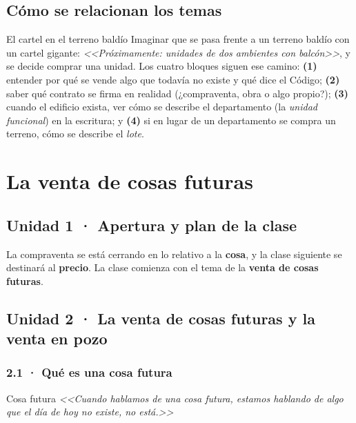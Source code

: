 \documentclass[12pt,oneside]{book}
\begin{document}
\section{Cómo se relacionan los temas}

\begin{example}{El cartel en el terreno baldío}
Imaginar que se pasa frente a un terreno baldío con un cartel gigante: \textit{<<Próximamente: unidades de dos ambientes con balcón>>}, y se decide comprar una unidad. Los cuatro bloques siguen ese camino: \textbf{(1)} entender por qué se vende algo que todavía no existe y qué dice el Código; \textbf{(2)} saber qué contrato se firma en realidad (¿compraventa, obra o algo propio?); \textbf{(3)} cuando el edificio exista, ver cómo se describe el departamento (la \textit{unidad funcional}) en la escritura; y \textbf{(4)} si en lugar de un departamento se compra un terreno, cómo se describe el \textit{lote}.
\end{example}

\chapter{La venta de cosas futuras}

\section{Unidad 1 · Apertura y plan de la clase}

La compraventa se está cerrando en lo relativo a la \textbf{cosa}, y la clase siguiente se destinará al \textbf{precio}. La clase comienza con el tema de la \textbf{venta de cosas futuras}.

\section{Unidad 2 · La venta de cosas futuras y la venta en pozo}

\subsection{2.1 · Qué es una cosa futura}

\begin{definition}{Cosa futura}
\textit{<<Cuando hablamos de una cosa futura, estamos hablando de algo que el día de hoy no existe, no está.>>}
\end{definition}
\end{document}
